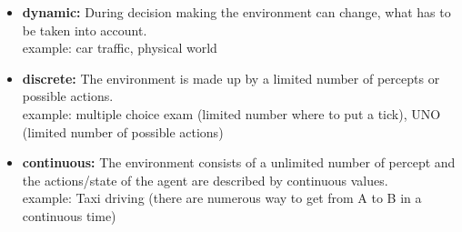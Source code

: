 \begin{itemize}
\item \textbf{dynamic:} During decision making the environment can change, what has to be taken into account.\\
example: car traffic, physical world
\item \textbf{discrete:} The environment is made up by a limited number of percepts or possible actions.\\
example: multiple choice exam (limited number where to put a tick), UNO (limited number of possible actions)
\item \textbf{continuous:} The environment consists of a unlimited number of percept and the actions/state of the agent are described by continuous values.\\
example: Taxi driving (there are numerous way to get from A to B in a continuous time)
\end{itemize}
